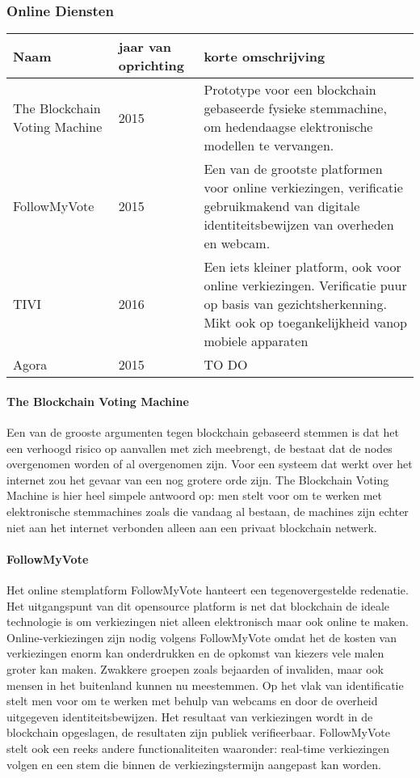 			\subsubsection{Online Diensten}
				\begin{center}
					\begin{tabular}{ l | l | p{5cm} }
						\hline
						Naam & jaar van oprichting & korte omschrijving \\ \hline
						The Blockchain Voting Machine  & 2015 & Prototype voor een blockchain gebaseerde fysieke stemmachine, om hedendaagse elektronische modellen te vervangen.\\ \hline
						FollowMyVote & 2015 & Een van de grootste platformen voor online verkiezingen, verificatie gebruikmakend van digitale identiteitsbewijzen van overheden en webcam.\\ \hline
						TIVI & 2016 &  Een iets kleiner platform, ook voor online verkiezingen. Verificatie puur op basis van gezichtsherkenning. Mikt ook op toegankelijkheid vanop mobiele apparaten  \\ \hline
						Agora & 2015 & TO DO %
					\end{tabular}
				\end{center}
				\paragraph{The Blockchain Voting Machine }
					Een van de grooste argumenten tegen blockchain gebaseerd stemmen is dat het een verhoogd risico op aanvallen met zich meebrengt, de bestaat  dat de nodes overgenomen worden of al overgenomen zijn. Voor een systeem dat werkt over het internet zou het gevaar van een nog grotere orde zijn. The Blockchain Voting Machine is hier heel simpele antwoord op: men stelt voor om te werken met elektronische stemmachines zoals die vandaag al bestaan,   de machines zijn echter niet aan het internet verbonden alleen aan een privaat blockchain netwerk.
				\paragraph{FollowMyVote}
					Het online stemplatform FollowMyVote hanteert een tegenovergestelde redenatie. Het uitgangspunt van dit opensource platform is net dat blockchain de ideale technologie is om verkiezingen niet alleen elektronisch maar ook online te maken. Online-verkiezingen zijn nodig volgens FollowMyVote omdat het de kosten van verkiezingen enorm kan onderdrukken en de opkomst van kiezers vele malen groter kan maken.  Zwakkere groepen zoals bejaarden of invaliden, maar ook mensen in het buitenland kunnen nu  meestemmen.  Op het vlak van identificatie stelt men voor om te werken met behulp van webcams en door de overheid uitgegeven identiteitsbewijzen. Het resultaat van verkiezingen wordt in de blockchain opgeslagen, de resultaten zijn publiek verifieerbaar. FollowMyVote stelt ook een reeks andere functionaliteiten waaronder: real-time verkiezingen volgen en een stem die binnen de verkiezingstermijn aangepast kan worden. 

